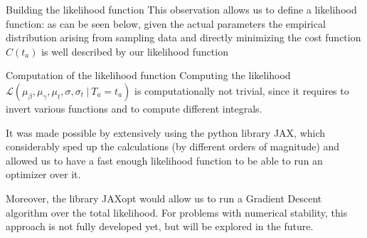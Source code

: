 \documentclass{beamer}
\begin{document}
\begin{frame}{Building the likelihood function}
  This observation allows us to define a likelihood function:
  as can be seen below, given the actual parameters the empirical distribution arising from sampling data and directly minimizing the cost function \(C(t_a)\) is well described by our likelihood function

  \begin{center}
  \end{center}
\end{frame}

\begin{frame}{Computation of the likelihood function}
  Computing the likelihood \(\mathcal{L}(\mu_\beta, \mu_\gamma, \mu_t, \sigma, \sigma_t\ \vert\ T_a = t_a)\) is computationally not trivial, since it requires to invert various functions and to compute different integrals.

  It was made possible by extensively using the python library JAX, which considerably sped up the calculations (by different orders of magnitude) and allowed us to have a fast enough likelihood function to be able to run an optimizer over it.

  Moreover, the library JAXopt  would allow us to run a Gradient Descent algorithm over the total likelihood.
  For problems with numerical stability, this approach is not fully developed yet, but will be explored in the future.
\end{frame}
\end{document}
